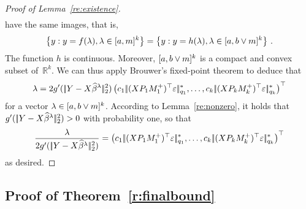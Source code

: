 \documentclass[bj]{imsart}
\newcommand{\normtwo}[1]{\ensuremath{\!|\!| #1 | \! |_{2}}}
\newcommand{\norm}[1]{\ensuremath{\!|\!| #1 | \! |}}
\newcommand{\1}{{\rm 1}\mskip -4,5mu{\rm l} }
\def\R{\mathbb{R}}
\begin{document}
\begin{proof}[Proof of Lemma~\ref{re:existence}]
\begin{align*}
\end{align*}
have the same images, that is,
\begin{align*}
\left\{y: y=f(\lambda),\lambda\in[a,m]^{k} \right\}=\left\{y: y=h(\lambda),\lambda\in[a,b\vee m]^{k} \right\}\,.
\end{align*}
The function  $h$ is continuous. Moreover, $[a,b\vee m]^{k}$ is a compact and convex subset of~$\R^k$. We can thus apply  Brouwer's fixed-point theorem to deduce that 
\begin{align*}
\lambda=2g'(\,\normtwo{\outcome-\design\estimator^{\lambda}}^2)\left(\tuningrelax_1\,\norm{(\design \projectionmatrix_1\fusedmatrix_1^{+})^\top\noise}_{q_1}^*,\dots,\tuningrelax_k\,\norm{(\design \projectionmatrix_k\fusedmatrix_k^{+})^\top\noise}_{q_k}^*\right)^\top
\end{align*}
for a vector  $\lambda\in [a,b\vee m]^{k}$. According to Lemma~\ref{re:nonzero}, it holds  that $g'(\,\normtwo{\outcome-\design\estimatort}^2)>0$ with probability one, so that
 \begin{equation*}
   \frac{\tuningparameter}{2g'(\,\normtwo{\outcome-\design\estimator^{\lambda}}^2)}=\left(\tuningrelax_1\,\norm{(\design  \projectionmatrix_1\fusedmatrix_1^{+})^\top \noise}_{q_1}^*,\dots, \tuningrelax_k\,\norm{(\design  \projectionmatrix_\numbergroups\fusedmatrix_\numbergroups^{+})^\top \noise}_{q_\numbergroups}^*\right)^\top
  \end{equation*}
as desired.
\end{proof}










\subsection{Proof of Theorem~\ref{r:finalbound}}

\end{document}
